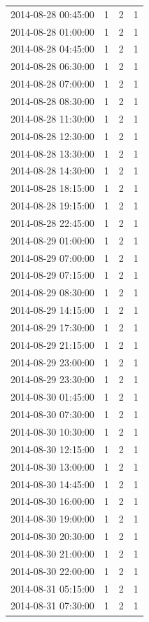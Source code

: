 \begin{tabular}{lrrr}
2014-08-28 00:45:00 & 1 & 2 & 1 \\
2014-08-28 01:00:00 & 1 & 2 & 1 \\
2014-08-28 04:45:00 & 1 & 2 & 1 \\
2014-08-28 06:30:00 & 1 & 2 & 1 \\
2014-08-28 07:00:00 & 1 & 2 & 1 \\
2014-08-28 08:30:00 & 1 & 2 & 1 \\
2014-08-28 11:30:00 & 1 & 2 & 1 \\
2014-08-28 12:30:00 & 1 & 2 & 1 \\
2014-08-28 13:30:00 & 1 & 2 & 1 \\
2014-08-28 14:30:00 & 1 & 2 & 1 \\
2014-08-28 18:15:00 & 1 & 2 & 1 \\
2014-08-28 19:15:00 & 1 & 2 & 1 \\
2014-08-28 22:45:00 & 1 & 2 & 1 \\
2014-08-29 01:00:00 & 1 & 2 & 1 \\
2014-08-29 07:00:00 & 1 & 2 & 1 \\
2014-08-29 07:15:00 & 1 & 2 & 1 \\
2014-08-29 08:30:00 & 1 & 2 & 1 \\
2014-08-29 14:15:00 & 1 & 2 & 1 \\
2014-08-29 17:30:00 & 1 & 2 & 1 \\
2014-08-29 21:15:00 & 1 & 2 & 1 \\
2014-08-29 23:00:00 & 1 & 2 & 1 \\
2014-08-29 23:30:00 & 1 & 2 & 1 \\
2014-08-30 01:45:00 & 1 & 2 & 1 \\
2014-08-30 07:30:00 & 1 & 2 & 1 \\
2014-08-30 10:30:00 & 1 & 2 & 1 \\
2014-08-30 12:15:00 & 1 & 2 & 1 \\
2014-08-30 13:00:00 & 1 & 2 & 1 \\
2014-08-30 14:45:00 & 1 & 2 & 1 \\
2014-08-30 16:00:00 & 1 & 2 & 1 \\
2014-08-30 19:00:00 & 1 & 2 & 1 \\
2014-08-30 20:30:00 & 1 & 2 & 1 \\
2014-08-30 21:00:00 & 1 & 2 & 1 \\
2014-08-30 22:00:00 & 1 & 2 & 1 \\
2014-08-31 05:15:00 & 1 & 2 & 1 \\
2014-08-31 07:30:00 & 1 & 2 & 1 \\

\end{tabular}
